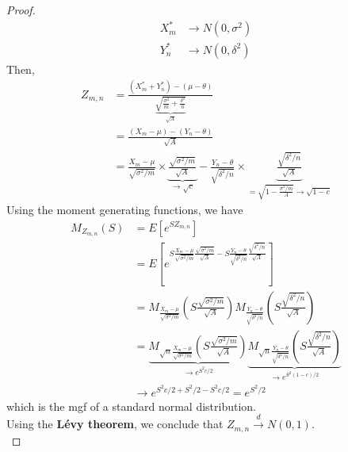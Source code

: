 \begin{proof}
    \begin{align*}
        X_m^* & \to N(0,\sigma^2)\\
        Y^*_n & \to N(0, \delta^2)
    \end{align*}
    Then,
    \begin{align*}
        Z_{m,n} & = \frac{(X_m^* + Y_n^*)-(\mu-\theta)}{\underbrace{\sqrt{\frac{\sigma^2}{m}+\frac{\delta^2}{n}}}_{\sqrt{A}}}\\
        & = \frac{(X_m-\mu)-(Y_n-\theta)}{\sqrt{A}}\\
        & = \frac{X_m-\mu}{\sqrt{\sigma^2/m}}\times\underbrace{\frac{\sqrt{\sigma^2/m}}{\sqrt{A}}}_{\to\sqrt{c}} 
        - \frac{Y_n-\theta}{\sqrt{\delta^2/n}}\times\underbrace{\frac{\sqrt{\delta^2/n}}{\sqrt{A}}}_{=\sqrt{1-\frac{\sigma^2/m}{A}}\to\sqrt{1-c}}
    \end{align*}
    Using the moment generating functions, we have
    \begin{align*}
        M_{Z_{m,n}}(S) & = E\left[e^{SZ_{m,n}}\right]\\
        & = E\left[e^{S\frac{X_m-\mu}{\sqrt{\sigma^2/m}}\frac{\sqrt{\sigma^2/m}}{\sqrt{A}}-S\frac{Y_n-\theta}{\sqrt{\delta^2/n}}\frac{\sqrt{\delta^2/n}}{\sqrt{A}}}\right]\\
        & = M_{\frac{X_m-\mu}{\sqrt{\sigma^2/m}}}\left(S\frac{\sqrt{\sigma^2/m}}{\sqrt{A}}\right)M_{\frac{Y_n-\theta}{\sqrt{\delta^2/n}}}\left(S\frac{\sqrt{\delta^2/n}}{\sqrt{A}}\right)\\
        & = \underbrace{M_{\sqrt{n}\frac{X_m-\mu}{\sqrt{\sigma^2/m}}}\left(S\frac{\sqrt{\sigma^2/m}}{\sqrt{A}}\right)}_{\to e^{S^2 c/2}}
        \underbrace{M_{\sqrt{n}\frac{Y_n-\theta}{\sqrt{\delta^2/n}}}\left(S\frac{\sqrt{\delta^2/n}}{\sqrt{A}}\right)}_{\to e^{S^2 (1-c)/2}}\\
        & \to e^{S^2c/2+S^2/2 - S^2 c/2} = e^{S^2/2}
    \end{align*}
    which is the mgf of a standard normal distribution.\\

    Using the \textbf{Lévy theorem}, we conclude that $Z_{m,n}\xrightarrow{d}N(0,1)$.\\
\end{proof}

